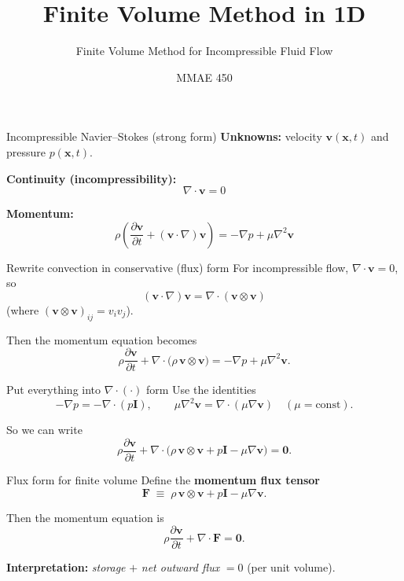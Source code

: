 \documentclass[aspectratio=169]{beamer}
\title{Finite Volume Method in 1D}
\subtitle{Finite Volume Method for Incompressible Fluid Flow}
\author{MMAE 450}
\date{}
\begin{document}
\begin{frame}
  \titlepage
\end{frame}

\begin{frame}{Incompressible Navier--Stokes (strong form)}
\textbf{Unknowns:} velocity $\mathbf{v}(\mathbf{x},t)$ and pressure $p(\mathbf{x},t)$.

\bigskip
\textbf{Continuity (incompressibility):}
\[
\nabla\cdot\mathbf{v}=0
\]

\textbf{Momentum:}
\[
\rho\left(\frac{\partial \mathbf{v}}{\partial t}+(\mathbf{v}\cdot\nabla)\mathbf{v}\right)
=
-\nabla p+\mu\nabla^2\mathbf{v}
\]
\end{frame}
\begin{frame}{Rewrite convection in conservative (flux) form}
For incompressible flow, $\nabla\cdot\mathbf{v}=0$, so
\[
(\mathbf{v}\cdot\nabla)\mathbf{v}
=
\nabla\cdot(\mathbf{v}\otimes\mathbf{v})
\]
(where $(\mathbf{v}\otimes\mathbf{v})_{ij}=v_i v_j$).

\bigskip
Then the momentum equation becomes
\[
\rho\frac{\partial \mathbf{v}}{\partial t}
+
\nabla\cdot\big(\rho\,\mathbf{v}\otimes\mathbf{v}\big)
=
-\nabla p+\mu\nabla^2\mathbf{v}.
\]
\end{frame}

\begin{frame}{Put everything into $\nabla\cdot(\cdot)$ form}
Use the identities
\[
-\nabla p = -\nabla\cdot(p\mathbf{I}),
\qquad
\mu\nabla^2\mathbf{v} = \nabla\cdot(\mu\nabla\mathbf{v})
\quad (\mu=\text{const}).
\]

\bigskip
So we can write
\[
\rho\frac{\partial \mathbf{v}}{\partial t}
+
\nabla\cdot\Big(\rho\,\mathbf{v}\otimes\mathbf{v}
+ p\mathbf{I}
-\mu\nabla\mathbf{v}\Big)
=\mathbf{0}.
\]
\end{frame}
\begin{frame}{Flux form for finite volume}
Define the \textbf{momentum flux tensor}
\[
\mathbf{F}
\;\equiv\;
\rho\,\mathbf{v}\otimes\mathbf{v}
+ p\mathbf{I}
-\mu\nabla\mathbf{v}.
\]

\bigskip
Then the momentum equation is
\[
\boxed{
\rho \frac{\partial \mathbf{v}}{\partial t}
+\nabla\cdot\mathbf{F}
=
\mathbf{0}.
}
\]

\bigskip
\textbf{Interpretation:} \emph{storage} $+$ \emph{net outward flux} $=0$ (per unit volume).
\end{frame}
\end{document}
